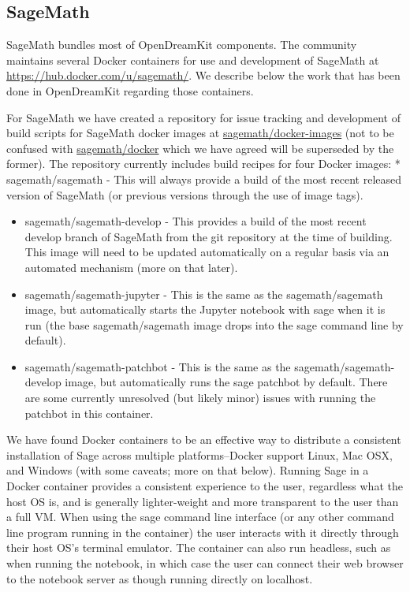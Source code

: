 \subsection{SageMath}\label{sagemath}

SageMath bundles most of OpenDreamKit components. The community
maintains several Docker containers for use and development of SageMath
at \url{https://hub.docker.com/u/sagemath/}. We describe below the work that
has been done in OpenDreamKit regarding those containers.

For SageMath we have created a repository for issue tracking and
development of build scripts for SageMath docker images at
\href{https://github.com/sagemath/docker-images}{sagemath/docker-images}
(not to be confused with
\href{https://github.com/sagemath/docker/}{sagemath/docker} which we
have agreed will be superseded by the former). The repository currently
includes build recipes for four Docker images: * sagemath/sagemath -
This will always provide a build of the most recent released version of
SageMath (or previous versions through the use of image tags).

\begin{itemize}
\item
  sagemath/sagemath-develop - This provides a build of the most recent
  develop branch of SageMath from the git repository at the time of
  building. This image will need to be updated automatically on a
  regular basis via an automated mechanism (more on that later).
\item
  sagemath/sagemath-jupyter - This is the same as the sagemath/sagemath
  image, but automatically starts the Jupyter notebook with sage when it
  is run (the base sagemath/sagemath image drops into the sage command
  line by default).
\item
  sagemath/sagemath-patchbot - This is the same as the
  sagemath/sagemath-develop image, but automatically runs the sage
  patchbot by default. There are some currently unresolved (but likely
  minor) issues with running the patchbot in this container.
\end{itemize}

We have found Docker containers to be an effective way to distribute a
consistent installation of Sage across multiple platforms--Docker
support Linux, Mac OSX, and Windows (with some caveats; more on that
below). Running Sage in a Docker container provides a consistent
experience to the user, regardless what the host OS is, and is generally
lighter-weight and more transparent to the user than a full VM. When
using the sage command line interface (or any other command line program
running in the container) the user interacts with it directly through
their host OS's terminal emulator. The container can also run headless,
such as when running the notebook, in which case the user can connect
their web browser to the notebook server as though running directly on
localhost.


